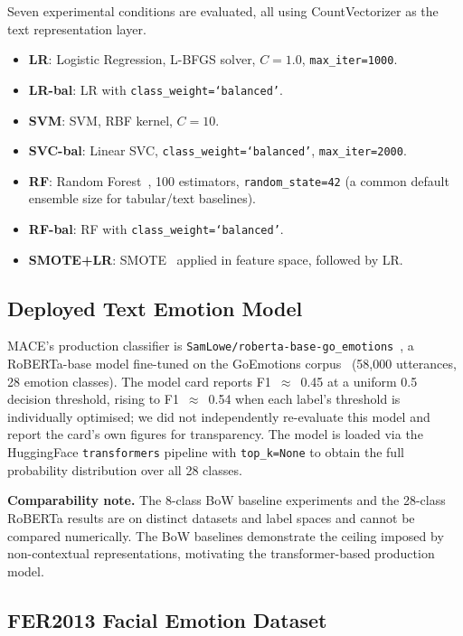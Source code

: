 \documentclass[sigconf, review=true]{acmart}
\begin{document}
Seven experimental conditions are evaluated, all using
CountVectorizer as the text representation layer.

\begin{itemize}
    \item \textbf{LR}: Logistic Regression, L-BFGS solver,
          $C{=}1.0$, \texttt{max\_iter=1000}.
    \item \textbf{LR-bal}: LR with \texttt{class\_weight=`balanced'}.
    \item \textbf{SVM}: SVM, RBF kernel, $C{=}10$.
    \item \textbf{SVC-bal}: Linear SVC,
          \texttt{class\_weight=`balanced'},
          \texttt{max\_iter=2000}.
    \item \textbf{RF}: Random Forest~\cite{breiman2001rf},
          100 estimators, \texttt{random\_state=42} (a common
          default ensemble size for tabular/text baselines).
    \item \textbf{RF-bal}: RF with
          \texttt{class\_weight=`balanced'}.
    \item \textbf{SMOTE+LR}: SMOTE~\cite{chawla2002smote}
          applied in feature space, followed by LR.
\end{itemize}

\subsection{Deployed Text Emotion Model}

MACE's production classifier is
\texttt{SamLowe/roberta-base-go\_emotions}~\cite{samlow2022goemotions},
a RoBERTa-base model fine-tuned on the GoEmotions
corpus~\cite{demszky2020goemotions} (58,000 utterances,
28 emotion classes).
The model card reports F1~$\approx$~0.45 at a uniform 0.5
decision threshold, rising to F1~$\approx$~0.54 when each label's
threshold is individually optimised; we did not independently
re-evaluate this model and report the card's own figures for
transparency.
The model is loaded via the HuggingFace \texttt{transformers}
pipeline with \texttt{top\_k=None} to obtain the full
probability distribution over all 28 classes.

\textbf{Comparability note.}
The 8-class BoW baseline experiments and the 28-class RoBERTa
results are on distinct datasets and label spaces and cannot be
compared numerically.
The BoW baselines demonstrate the ceiling imposed by
non-contextual representations, motivating the transformer-based
production model.

\subsection{FER2013 Facial Emotion Dataset}
\label{sec:fer_setup}
\end{document}

